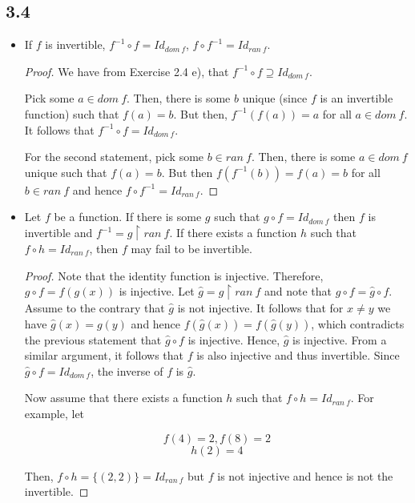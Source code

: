 \subsection*{3.4} 

\begin{itemize}
    \item If $f$ is invertible, $f^{-1} \circ f = Id_{dom~f}$, $f \circ f^{-1} = Id_{ran~f}$.
    
    \begin{proof}
        We have from Exercise 2.4 e), that $f^{-1} \circ f \supseteq Id_{dom~f}$. 
        
        Pick some $a \in dom~f$. Then, there is some $b$ unique (since $f$ is an invertible function) such that $f(a) = b$. But then, $f^{-1}(f(a)) = a$ for all $a \in dom~f$. It follows that $f^{-1} \circ f = Id_{dom~f}$.
        
        \vspace{1em}
        
        For the second statement, pick some $b \in ran~f$. Then, there is some $a \in dom~f$ unique such that $f(a) = b$. But then $f(f^{-1}(b)) = f(a) = b$ for all $b \in ran~f$ and hence $f \circ f^{-1} = Id_{ran~f}$.
    \end{proof}
\newpage
    \item Let $f$ be a function. If there is some $g$ such that $g\circ f = Id_{dom~f} $ then $f$ is invertible and $f^{-1} = g \upharpoonright ran~f$. If there exists a function $h$ such that $f \circ h = Id_{ran~f}$, then $f$ may fail to be invertible.
    
    \begin{proof}
        Note that the identity function is injective. Therefore, $g \circ f = f(g(x))$ is injective. Let $\hat{g} = g \upharpoonright ran~f$ and note that $g \circ f = \hat{g} \circ f$. Assume to the contrary that $\hat{g}$ is not injective. It follows that for $x \neq y$ we have $\hat{g}(x) = g(y)$ and hence $f(\hat{g}(x)) = f(\hat{g}(y))$, which contradicts the previous statement that $\hat{g} \circ f$ is injective. Hence, $\hat{g}$ is injective. From a similar argument, it follows that $f$ is also injective and thus invertible. Since $\hat{g}\circ f = Id_{dom~f} $, the inverse of $f$ is $\hat{g}$.
        
        \vspace{1em}
        
        Now assume that there exists a function $h$ such that $f \circ h = Id_{ran~f}$. For example, let
        
        $$f(4) = 2, f(8) = 2$$
        $$h(2) = 4$$
        
        Then, $f \circ h = \{(2, 2)\} = Id_{ran~f}$ but $f$ is not injective and hence is not the invertible.
    \end{proof}
\end{itemize}

